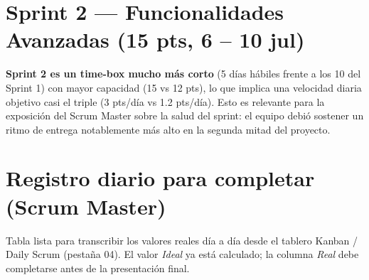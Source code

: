 \documentclass[11pt]{article}
\begin{document}
\section{Sprint 2 --- Funcionalidades Avanzadas (15 pts, 6 -- 10 jul)}

\begin{center}
\end{center}

\noindent\textbf{Sprint 2 es un time-box mucho más corto} (5 días hábiles frente a los 10 del Sprint 1)
con mayor capacidad (15 vs 12 pts), lo que implica una velocidad diaria objetivo casi el triple
(3 pts/día vs 1.2 pts/día). Esto es relevante para la exposición del Scrum Master sobre la salud del
sprint: el equipo debió sostener un ritmo de entrega notablemente más alto en la segunda mitad del
proyecto.

\section{Registro diario para completar (Scrum Master)}
\label{sec:registro}
Tabla lista para transcribir los valores reales día a día desde el tablero Kanban / Daily Scrum
(pestaña 04). El valor \textit{Ideal} ya está calculado; la columna \textit{Real} debe completarse antes
de la presentación final.
\end{document}
